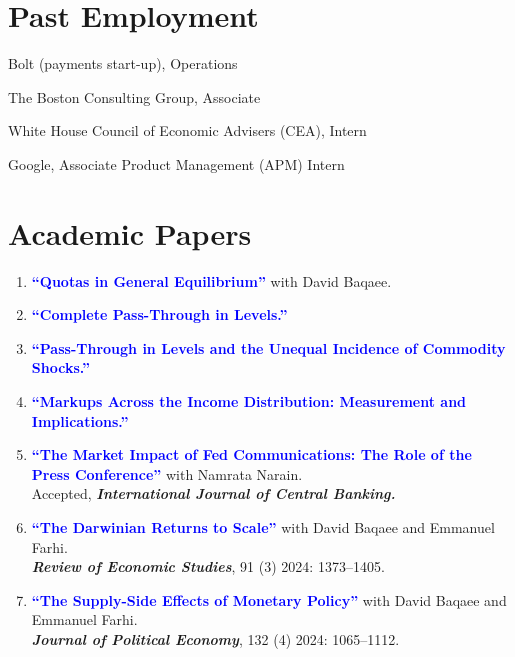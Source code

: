 \documentclass[letterpaper]{article}
\newcommand{\academicpaper}[1]{\textcolor{Blue}{\textbf{``#1''}}}
\newcommand{\journal}[1]{\textbf{\textit{#1}}}
\begin{document}
\section*{Past Employment}
\begin{description}[labelindent=0pt, labelwidth=1in, labelsep*=1em, leftmargin =!, font=\normalfont]
\item[2018--2019] Bolt (payments start-up), Operations
\item[2017--2018] The Boston Consulting Group, Associate
\item[2016] White House Council of Economic Advisers (CEA), Intern
\item[2016] Google, Associate Product Management (APM) Intern
\end{description}

\section*{Academic Papers}
\begin{enumerate}
\item \academicpaper{Quotas in General Equilibrium} {with David Baqaee.} 
\item \academicpaper{Complete Pass-Through in Levels.} 
\item \academicpaper{Pass-Through in Levels and the Unequal Incidence of Commodity Shocks.} 
\item \academicpaper{Markups Across the Income Distribution: Measurement and Implications.} 
\item \academicpaper{The Market Impact of Fed Communications: The Role of the Press Conference} 
{with Namrata Narain.}\\
Accepted, \journal{International Journal of Central Banking.}
\item \academicpaper{The Darwinian Returns to Scale} 
{with David Baqaee and Emmanuel Farhi.}\\ 
\journal{Review of Economic Studies}, 91 (3) 2024: 1373--1405.
\item \academicpaper{The Supply-Side Effects of Monetary Policy} 
{with David Baqaee and Emmanuel Farhi.}\\ 
\journal{Journal of Political Economy}, 132 (4) 2024: 1065--1112.
\end{enumerate}
\end{document}
